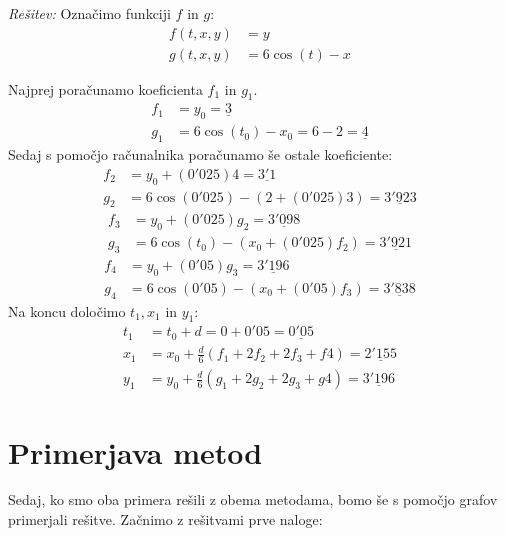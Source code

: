 \documentclass[a4paper, 10pt]{article}
\newenvironment{resitev}{\begin{flushleft}\textit{Rešitev:}}{\hfill\end{flushleft}}
\begin{document}
			\begin{resitev}
				Označimo funkciji $f$ in $g$:
				\begin{align*}
					f(t, x, y) &= y \\
					g(t, x, y) &= 6\cos(t) - x
				\end{align*}
				
				Najprej poračunamo koeficienta $f_1$ in $g_1$. \begin{align*}
					f_1 &= y_0 = \underline{3}\\
					g_1 &= 6\cos(t_0) - x_0 = 6 - 2 = \underline{4}
				\end{align*}
				Sedaj s pomočjo računalnika poračunamo še ostale koeficiente:
				\begin{align*} 
					f_2 &= y_0 + (0'025)4=\underline{3'1} \\
					g_2 &= 6\cos(0'025) - (2 + (0'025)3)=\underline{3'923}
				\end{align*} 
				\begin{align*}
					f_3 &= y_0 + (0'025)g_2 =\underline{3'098} \\
					g_3 &= 6\cos(t_0) - (x_0 + (0'025)f_2)=\underline{3'921}
				\end{align*}
				\begin{align*} 
					f_4 &= y_0 + (0'05)g_3 =\underline{3'196}\\
					g_4 &= 6\cos(0'05) - (x_0 + (0'05)f_3)=\underline{3'838}
				\end{align*}
				Na koncu določimo $t_1, x_1$ in $y_1$: \begin{align*}
					t_1 &= t_0 + d = 0 + 0'05 = \underline{0'05} \\
					x_1 &= x_0 + \frac{d}{6}(f_1 + 2f_2 + 2f_3 + f4)= \underline{2'155}\\
					y_1 &= y_0 + \frac{d}{6}(g_1 + 2g_2 + 2g_3 + g4)= \underline{3'196}
				\end{align*}
			\end{resitev}
			
		\section{Primerjava metod}
			
		Sedaj, ko smo oba primera rešili z obema metodama, bomo še s pomočjo grafov primerjali rešitve. Začnimo z rešitvami prve naloge:
		
\end{document}
